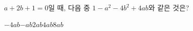 $a+2b+1=0$일 때, 다음 중 $1-a^2-4b^2+4ab$와 같은 것은?
\begin{choices32}{$-4ab$}{$-ab$}{$2ab$}{$4ab$}{$8ab$}\end{choices32}
